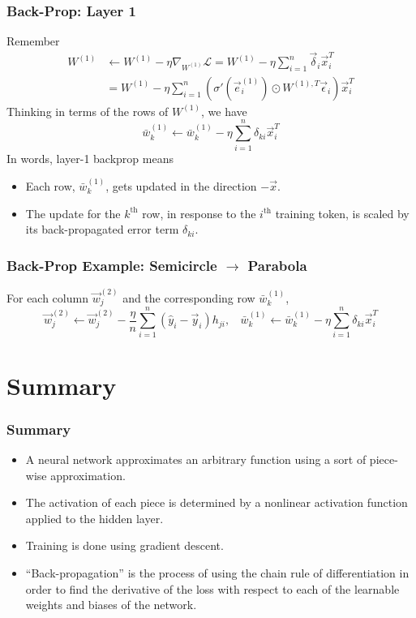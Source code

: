 \documentclass{beamer}
\begin{document}
\begin{frame}
  \frametitle{Back-Prop: Layer 1}
  Remember
  \begin{align*}
    W^{(1)} &\leftarrow W^{(1)}-\eta\nabla_{W^{(1)}}{\mathcal L}
    = W^{(1)}-\eta\sum_{i=1}^n \vec\delta_i\vec{x}_i^T\\
    &= W^{(1)}-\eta\sum_{i=1}^n \left(\sigma'(\vec{e}_i^{(1)})\odot W^{(1),T}\vec\epsilon_i\right)\vec{x}_i^T
  \end{align*}
  Thinking in terms of the rows of $W^{(1)}$, we have
  \[
  \bar{w}_k^{(1)} \leftarrow
  \bar{w}_k^{(1)}-\eta\sum_{i=1}^n\delta_{ki}\vec{x}_i^T
  \]
  In words, layer-1 backprop means
  \begin{itemize}
  \item Each row, $\bar{w}_k^{(1)}$, gets updated in the direction
    $-\vec{x}$.
  \item The update for the $k^{\textrm{th}}$ row, in response to
    the $i^{\textrm{th}}$ training token, is scaled by its
    back-propagated error term $\delta_{ki}$.
  \end{itemize}
\end{frame}

\begin{frame}
  \frametitle{Back-Prop Example: Semicircle $\rightarrow$ Parabola}
  For each column $\vec{w}_j^{(2)}$ and the corresponding row $\bar{w}_k^{(1)}$,
  \[
  \vec{w}_j^{(2)} \leftarrow
  \vec{w}_j^{(2)}-\frac{\eta}{n}\sum_{i=1}^n \left(\hat{y}_i-\vec{y}_i\right)h_{ji},~~~~
  \bar{w}_k^{(1)} \leftarrow
  \bar{w}_k^{(1)}-\eta\sum_{i=1}^n\delta_{ki}\vec{x}_i^T
  \]
  \centerline{}
\end{frame}

\section[Summary]{Summary}
\setcounter{subsection}{1}

\begin{frame}
  \frametitle{Summary}
  \begin{itemize}
  \item A neural network approximates an arbitrary function using a sort of piece-wise approximation.
  \item The activation of each piece is determined by a nonlinear activation function applied to
    the hidden layer.
  \item Training is done using gradient descent.
  \item ``Back-propagation'' is the process of using the chain rule of differentiation
    in order to find the derivative of the loss with respect to each of the learnable weights
    and biases of the network.
  \end{itemize}
\end{frame}
    
\end{document}
